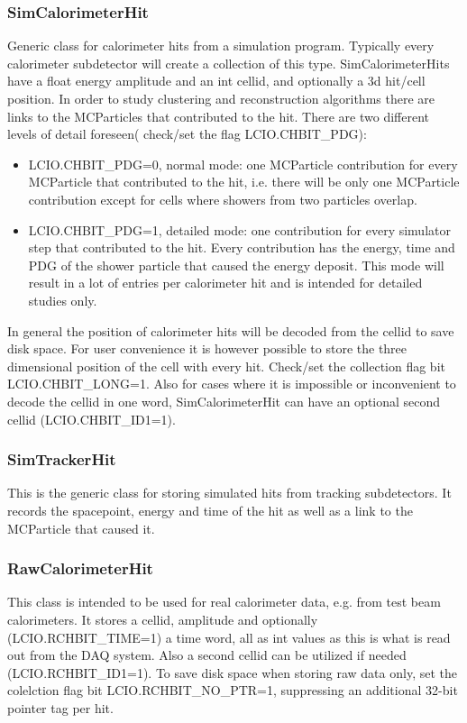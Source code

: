 \documentclass[twoside]{article}
\begin{document}
\subsubsection{SimCalorimeterHit}
Generic class for calorimeter hits from a simulation program. Typically every calorimeter subdetector
will create a collection of this type. SimCalorimeterHits have a float energy amplitude and an int cellid,
and optionally a 3d hit/cell position. 
In order to study clustering and reconstruction algorithms there are links to the MCParticles that contributed 
to the hit. There are two different levels of detail foreseen( check/set the flag LCIO.CHBIT\_PDG):
\begin{itemize}
\item{LCIO.CHBIT\_PDG=0, normal mode: one MCParticle contribution for every MCParticle that contributed to the 
hit, i.e. there will be only one MCParticle contribution except for cells where showers from two particles 
overlap.}
\item{LCIO.CHBIT\_PDG=1, detailed mode: one contribution for every simulator step that contributed to the hit.
Every contribution has the energy, time and PDG of the shower particle that caused  the energy deposit.
This mode will result in a lot of entries per calorimeter hit and is intended for detailed studies only. }
\end{itemize}
In general the position of calorimeter hits will be decoded from the cellid to save disk space. For user 
convenience it is however possible to store the three dimensional position of the cell with every hit.
Check/set the collection flag bit LCIO.CHBIT\_LONG=1.
Also for cases where it is impossible or inconvenient to decode the cellid in one word, SimCalorimeterHit can have 
an optional second cellid (LCIO.CHBIT\_ID1=1). 

\subsubsection{SimTrackerHit}
This is the generic class for storing simulated hits from tracking subdetectors. It records the spacepoint,  
energy and time of the hit as well as a link to the  MCParticle that caused it.

\subsubsection{RawCalorimeterHit}
This class is intended to be used for real calorimeter data, e.g. from test beam calorimeters.
It stores a cellid, amplitude and optionally (LCIO.RCHBIT\_TIME=1) a time word, all as int values as 
this is what is read out from the DAQ system. Also a second cellid can be utilized if needed (LCIO.RCHBIT\_ID1=1).
To save disk space when storing raw data only, set the colelction flag bit LCIO.RCHBIT\_NO\_PTR=1, 
suppressing an additional 32-bit  pointer tag per hit.
\end{document}
